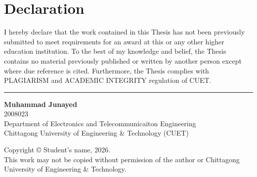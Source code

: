 \setcounter{secnumdepth}{-1}
\section{\hfil Declaration \hfil}
\vspace{1cm}
\thispagestyle{front}

\vspace{1cm}

\noindent
I hereby declare that the work contained in this Thesis has not been
previously submitted to meet requirements for an award at this or any other
higher education institution. To the best of my knowledge and belief, the Thesis
contains no material previously published or written by another person except
where due reference is cited. Furthermore, the Thesis complies with
PLAGIARISM and ACADEMIC INTEGRITY regulation of CUET.

\vspace{2cm}

\begin{flushright}
\noindent


\vspace{0.5cm}

\noindent
\rule{6cm}{0.4pt}

\vspace{0.5cm}

\textbf{Muhammad Junayed} \\
2008023 \\[0.3cm]
Department of Electronics and Telecommunicaiton Engineering \\[0.2cm]
Chittagong University of Engineering \& Technology (CUET)
\end{flushright}

\vfill

\noindent
Copyright © Student's name, 2026.\\
This work may not be copied without permission of the author or Chittagong University of Engineering \& Technology.

\setcounter{secnumdepth}{3}

\clearpage